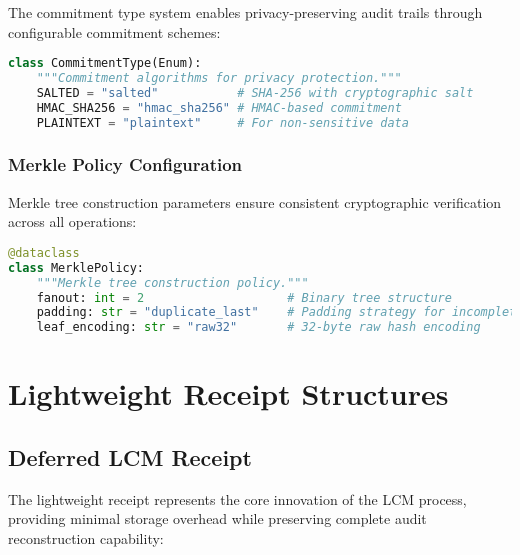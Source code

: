 \documentclass[12pt,a4paper]{article}
\begin{document}
The commitment type system enables privacy-preserving audit trails through configurable commitment schemes:

\begin{lstlisting}[language=Python, caption=Commitment Type Framework]
class CommitmentType(Enum):
    """Commitment algorithms for privacy protection."""
    SALTED = "salted"           # SHA-256 with cryptographic salt
    HMAC_SHA256 = "hmac_sha256" # HMAC-based commitment
    PLAINTEXT = "plaintext"     # For non-sensitive data
\end{lstlisting}

\subsubsection{Merkle Policy Configuration}

Merkle tree construction parameters ensure consistent cryptographic verification across all operations:

\begin{lstlisting}[language=Python, caption=Merkle Policy Configuration]
@dataclass
class MerklePolicy:
    """Merkle tree construction policy."""
    fanout: int = 2                    # Binary tree structure
    padding: str = "duplicate_last"    # Padding strategy for incomplete levels
    leaf_encoding: str = "raw32"       # 32-byte raw hash encoding
\end{lstlisting}

\section{Lightweight Receipt Structures}

\subsection{Deferred LCM Receipt}

The lightweight receipt represents the core innovation of the LCM process, providing minimal storage overhead while preserving complete audit reconstruction capability:
\end{document}
